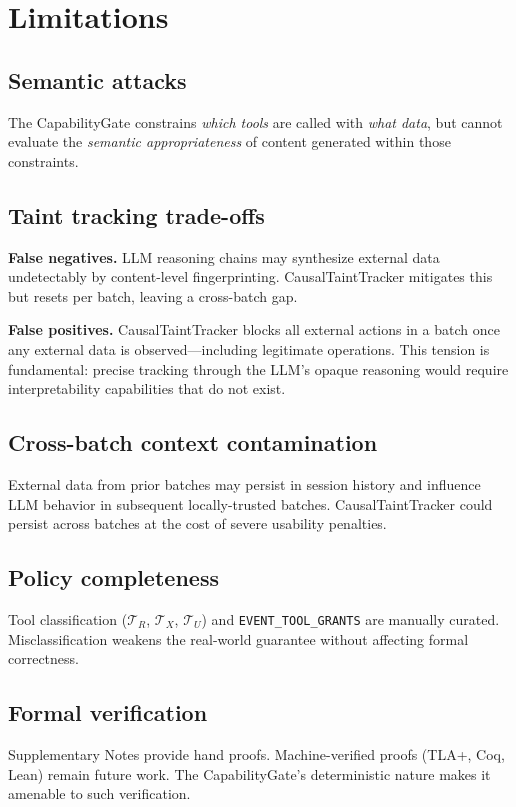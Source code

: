 \documentclass[pdflatex,sn-nature]{sn-jnl}%
\theoremstyle{thmstyleone}%
\theoremstyle{thmstyletwo}%
\theoremstyle{thmstylethree}%
\begin{document}
\section{Limitations}\label{sec:limitations}

\subsection{Semantic attacks}\label{subsec:semantic}
The CapabilityGate constrains \emph{which tools} are called with \emph{what data}, but cannot evaluate the \emph{semantic appropriateness} of content generated within those constraints.

\subsection{Taint tracking trade-offs}\label{subsec:taint-tradeoff}
\textbf{False negatives.} LLM reasoning chains may synthesize external data undetectably by content-level fingerprinting. CausalTaintTracker mitigates this but resets per batch, leaving a cross-batch gap.

\textbf{False positives.} CausalTaintTracker blocks all external actions in a batch once any external data is observed---including legitimate operations. This tension is fundamental: precise tracking through the LLM's opaque reasoning would require interpretability capabilities that do not exist.

\subsection{Cross-batch context contamination}\label{subsec:crossbatch}
External data from prior batches may persist in session history and influence LLM behavior in subsequent locally-trusted batches. CausalTaintTracker could persist across batches at the cost of severe usability penalties.

\subsection{Policy completeness}\label{subsec:policy}
Tool classification ($\mathcal{T}_R$, $\mathcal{T}_X$, $\mathcal{T}_U$) and \texttt{EVENT\_TOOL\_GRANTS} are manually curated. Misclassification weakens the real-world guarantee without affecting formal correctness.

\subsection{Formal verification}\label{subsec:formalverif}
Supplementary Notes provide hand proofs. Machine-verified proofs (TLA+, Coq, Lean) remain future work. The CapabilityGate's deterministic nature makes it amenable to such verification.
\end{document}
